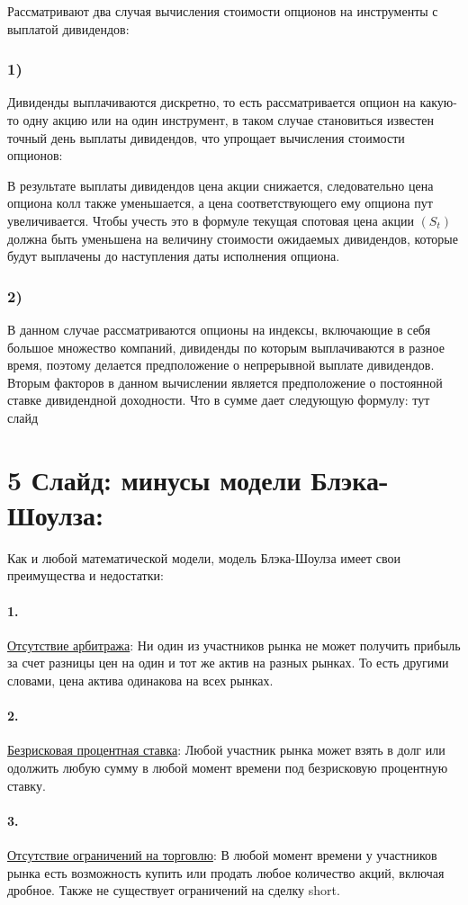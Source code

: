 \documentclass[a4paper]{article}
\begin{document}
Рассматривают два случая вычисления стоимости опционов на инструменты с выплатой дивидендов:
\subsubsection*{1)}
Дивиденды выплачиваются дискретно, то есть рассматривается опцион на какую-то одну акцию или на один инструмент, в таком случае становиться известен точный день выплаты дивидендов, что упрощает вычисления стоимости опционов:

В результате выплаты дивидендов цена акции снижается, следовательно цена опциона колл также уменьшается, а цена соответствующего ему опциона пут увеличивается. Чтобы учесть это в формуле текущая спотовая цена акции $(S_t)$ должна быть уменьшена на величину стоимости ожидаемых дивидендов, которые будут выплачены до наступления даты исполнения опциона.

\subsubsection*{2)}
В данном случае рассматриваются опционы на индексы, включающие в себя большое множество компаний, дивиденды по которым выплачиваются в разное время, поэтому делается предположение о непрерывной выплате дивидендов. Вторым факторов в данном вычислении является предположение о постоянной ставке дивидендной доходности. Что в сумме дает следующую формулу: тут слайд

\section*{5 Слайд: минусы модели Блэка-Шоулза:}
Как и любой математической модели, модель Блэка-Шоулза имеет свои преимущества и недостатки:
\paragraph*{1.} \underline{Отсутствие арбитража}: Ни один из участников рынка не может получить прибыль за счет разницы цен на один и тот же актив на разных рынках. То есть другими словами, цена актива одинакова на всех рынках.
\paragraph*{2.} \underline{Безрисковая процентная ставка}: Любой участник рынка может взять в долг или одолжить любую сумму в любой момент времени под безрисковую процентную ставку.
\paragraph*{3.} \underline{Отсутствие ограничений на торговлю}: В любой момент времени у участников рынка есть возможность купить или продать любое количество акций, включая дробное. Также не существует ограничений на сделку short.
\end{document}
